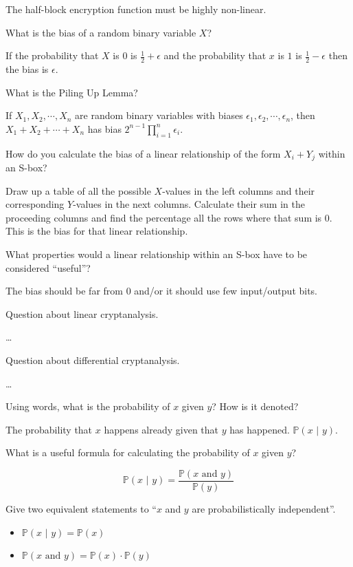 \documentclass{article}
\newcounter{qcounter}
\newcommand{\showqcounter}{\theqcounter}
\newcommand{\question}{\vspace{5mm}\addtocounter{qcounter}{1}\vspace{5mm}{\bf Q\showqcounter: }}
\newcommand{\answer}{\vspace{5mm}{\bf A\showqcounter: }}
\newcommand{\probgiven}[2]{\mathbb{P}\left( #1 \,\, \vert \,\, #2 \right)}
\newcommand{\prob}[1]{\mathbb{P}\left( #1 \right)}
\begin{document}
\answer The half-block encryption function must be highly non-linear.


\question What is the bias of a random binary variable $X$?

\answer If the probability that $X$ is $0$ is $\frac{1}{2} + \epsilon$ and the probability that $x$ is $1$ is $\frac{1}{2} - \epsilon$ then 
  the bias is $\epsilon$.


\question What is the Piling Up Lemma?

\answer If $X_1, X_2, \cdots, X_n$ are random binary variables with biases $\epsilon_1, \epsilon_2, \cdots, \epsilon_n$, then 
  $X_1 + X_2 + \cdots + X_n$ has bias $2^{n - 1} \prod_{i = 1}^n \epsilon_i$.


\question How do you calculate the bias of a linear relationship of the form $X_i + Y_j$ within an S-box?

\answer Draw up a table of all the possible $X$-values in the left columns and their corresponding $Y$-values in the next columns.
  Calculate their sum in the proceeding columns and find the percentage all the rows where that sum is $0$. This is the bias for that 
  linear relationship.


\question What properties would a linear relationship within an S-box have to be considered ``useful''?

\answer The bias should be far from $0$ and/or it should use few input/output bits.


\question Question about linear cryptanalysis.

\answer \dots


\question Question about differential cryptanalysis.

\answer \dots


\question Using words, what is the probability of $x$ given $y$? How is it denoted?

\answer The probability that $x$ happens already given that $y$ has happened. $\probgiven{x}{y}$.


\question What is a useful formula for calculating the probability of $x$ given $y$?

\answer 
  $$
    \probgiven{x}{y} = \frac{\prob{x \text{ and } y}}{\prob{y}}
  $$


\question Give two equivalent statements to ``$x$ and $y$ are probabilistically independent''.

\answer 
  \begin{itemize}
    \item $\probgiven{x}{y} = \prob{x}$
    \item $\prob{x \text{ and } y} = \prob{x} \cdot \prob{y}$
  \end{itemize}
\end{document}
